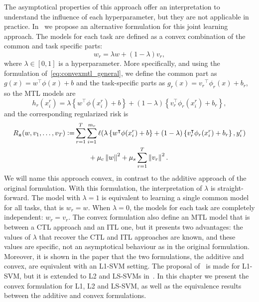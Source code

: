 The asymptotical properties of this approach offer an interpretation to understand the influence of each hyperparameter, but they are not applicable in practice.
In~\cite{RuizAD19} we propose an alternative formulation for this joint learning approach. The models for each task are defined as a convex combination of the common and task specific parts:
\begin{equation}
    \nonumber
    {w}_r = \lambda {w} + (1 - \lambda) {v}_r,
\end{equation}
where $\lambda \in \left[0, 1\right]$ is a hyperparameter.
More specifically, and using the formulation of~\eqref{eq:convexmtl_general}, we define the common part as $g(x) =  {w}^\intercal {\phi(x)} + b$ and the task-specific parts as $g_r(x) = {v_r}^\intercal {\phi_r(x)} + b_r$, so the MTL models are
\begin{equation}
    \nonumber
    h_r(x_i^r) = \lambda \left\lbrace {w}^\intercal {\phi(x_i^r)} + b \right\rbrace + (1 - \lambda) \left\lbrace {v}_r^\intercal {\phi_r(x_i^r)} + b_r \right\rbrace ,
\end{equation}
and the corresponding regularized risk is 
\begin{equation}
    \nonumber
    \begin{aligned}
        R_{\bm{z}} ({w, v_1, \ldots, v_T}) \vcentcolon= &\sum_{r=1}^{T} \sum_{i=1}^{m_r} \ell(\lambda \left\lbrace {w}^\intercal {\phi(x_i^r)} + b \right\rbrace + (1 - \lambda) \left\lbrace {v}_r^\intercal {\phi_r(x_i^r)} + b_r \right\rbrace, y_i^r) \\ 
        &\qquad + \mu_c \left\lVert{w}\right\rVert^2 + \mu_s \sum_{r=1}^T \left\lVert{v}_r\right\rVert^2 .
    \end{aligned}
\end{equation}
We will name this approach {convex}, in contrast to the {additive} approach of the original formulation.
With this formulation, the interpretation of $\lambda$ is straight-forward. The model with $\lambda = 1$ is equivalent to learning a single common model for all tasks, that is ${w}_r = {w}$. When $\lambda=0$, the models for each task are completely independent: ${w}_r = {v}_r$.
The convex formulation also define an MTL model that is between a CTL approach and an ITL one, but it presents two advantages: the values of $\lambda$ that recover the CTL and ITL approaches are known, and these values are specific, not an asymptotical behaviour as in the original formulation. 
%
Moreover, it is shown in the paper that the two formulations, the {additive} and {convex}, are equivalent with an L1-SVM setting.
%
The proposal of~\cite{RuizAD19} is made for L1-SVM, but it is extended to L2 and LS-SVMs in~\cite{RuizAD21}. In this chapter we present the convex formulation for L1, L2 and LS-SVM, as well as the equivalence results between the {additive} and {convex} formulations.




